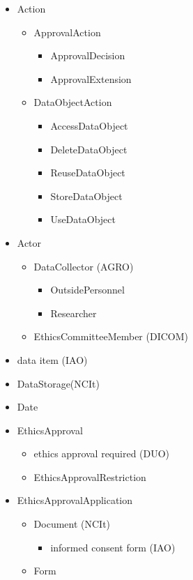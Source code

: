 \documentclass[10pt]{article}
\begin{document}
 \begin{itemize}
 \item Action
 	\begin{itemize}
 		\item ApprovalAction
 			\begin{itemize}
 				\item ApprovalDecision
 				\item ApprovalExtension
 			\end{itemize}
 		\item DataObjectAction
 			\begin{itemize}
 				\item AccessDataObject
 				\item DeleteDataObject
 				\item ReuseDataObject
 				\item StoreDataObject
 				\item UseDataObject
 			\end{itemize}
 	\end{itemize}
 \item Actor
 	\begin{itemize}
 		\item DataCollector (AGRO)
 		 	\begin{itemize}
 		 		\item OutsidePersonnel
 		 		\item Researcher 
 			\end{itemize}
 		\item EthicsCommitteeMember (DICOM)
 	\end{itemize}
 \item data item (IAO)
 \item DataStorage(NCIt)
 \item Date
 \item EthicsApproval
  	\begin{itemize}
  		\item ethics approval required (DUO)
  		\item EthicsApprovalRestriction
 	\end{itemize}
 \item EthicsApprovalApplication
  	\begin{itemize}
  		\item Document (NCIt)
  			 	\begin{itemize}
  			 		\item informed consent form (IAO)
 				\end{itemize}
 		\item Form

\end{itemize}
\end{itemize}
\end{document}
